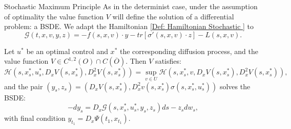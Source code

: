 \documentclass[10pt, compress]{beamer}
\begin{document}
\begin{frame}{Stochastic Maximum Principle}
    As in the determinist case, under the assumption of optimality the value function $V$ will define the solution of a differential problem: a BSDE. We adapt the Hamiltonian \ref{Def: Hamiltonian Stochastic  } to 
    \begin{equation}\label{3-2-defG}\mathcal{G}(t,x,v,y,z) = -f(s,x,v)\cdot y - tr\left[\sigma'(s,x,v)\cdot z\right] - L(s,x,v).\end{equation}

    \begin{theorem}\label{2-3-stochmaxprinc}
    Let $u^{\ast}$ be an optimal control and $x^{\ast}$ the corresponding diffusion process, and the value function 
    $V\in C^{1,2}(O)\cap C(\overline{O})$. Then $V$ satisfies:
    \begin{equation}\label{2-3-maxcond}
        \mathcal{H}(s,x_s^{\ast}, u_s^{\ast}, D_xV(s,x^{\ast}_s), D_x^2V(s,x^{\ast}_s)) = \sup_{v \in U}\mathcal{H}(s,x_s^{\ast}, v, D_xV(s,x^{\ast}_s), D_x^2V(s,x^{\ast}_s)),
    \end{equation}
    and the pair $(y_s,z_s)=\left(D_xV(s,x_s^{\ast}),D_x^2v(s,x_s^{\ast})\sigma(s,x_s^{\ast},u_s^{\ast})\right)$ solves the BSDE:
    \begin{equation}\label{2-3-maxprinc-BSDE}
        -dy_s = D_x\mathcal{G}(s,x_s^{\ast}, u_s^{\ast}, y_s, z_s)ds - z_sdw_s,
    \end{equation}
    with final condition $y_{t_1} = D_x\Psi(t_1,x_{t_1}).$
    \end{theorem}
\end{frame}
\end{document}
